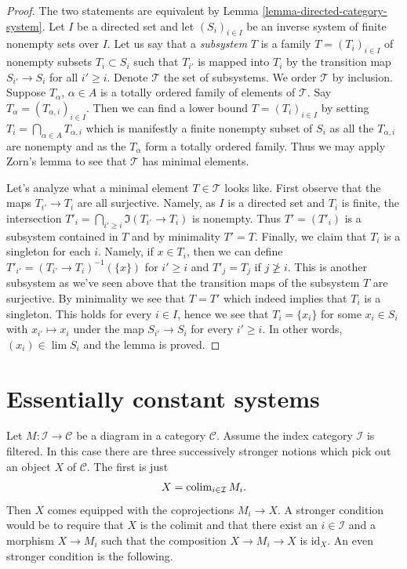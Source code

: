 \begin{proof}
The two statements are equivalent by
Lemma \ref{lemma-directed-category-system}.
Let $I$ be a directed set and let $(S_i)_{i \in I}$
be an inverse system of finite nonempty sets over $I$.
Let us say that a {\it subsystem} $T$ is a family $T = (T_i)_{i \in I}$
of nonempty subsets $T_i \subset S_i$ such that $T_{i'}$ is mapped
into $T_i$ by the transition map $S_{i'} \to S_i$ for all $i' \geq i$.
Denote $\mathcal{T}$ the set of subsystems. We order $\mathcal{T}$
by inclusion. Suppose $T_\alpha$, $\alpha \in A$ is a totally ordered family
of elements of $\mathcal{T}$. Say $T_\alpha = (T_{\alpha, i})_{i \in I}$.
Then we can find a lower bound $T = (T_i)_{i \in I}$ by setting
$T_i = \bigcap_{\alpha \in A} T_{\alpha, i}$ which is manifestly a
finite nonempty subset of $S_i$ as all the $T_{\alpha, i}$ are nonempty
and as the $T_\alpha$ form a totally ordered family. Thus we may
apply Zorn's lemma to see that $\mathcal{T}$ has minimal elements.

\medskip\noindent
Let's analyze what a minimal element $T \in \mathcal{T}$ looks like.
First observe that the maps $T_{i'} \to T_i$ are all surjective.
Namely, as $I$ is a directed set and $T_i$ is finite,
the intersection $T'_i = \bigcap_{i' \geq i} \Im(T_{i'} \to T_i)$
is nonempty. Thus $T' = (T'_i)$ is a subsystem contained in $T$ and
by minimality $T' = T$. Finally, we claim that $T_i$ is a singleton
for each $i$. Namely, if $x \in T_i$, then we can define
$T'_{i'} = (T_{i'} \to T_i)^{-1}(\{x\})$ for $i' \geq i$ and
$T'_j = T_j$ if $j \not \geq i$. This is another subsystem as we've seen
above that the transition maps of the subsystem $T$ are surjective.
By minimality we see that $T = T'$ which indeed implies that $T_i$
is a singleton. This holds for every $i \in I$, hence we see that
$T_i = \{x_i\}$ for some $x_i \in S_i$ with $x_{i'} \mapsto x_i$
under the map $S_{i'} \to S_i$ for every $i' \geq i$. In other words,
$(x_i) \in \lim S_i$ and the lemma is proved.
\end{proof}






\section{Essentially constant systems}
\label{section-essentially-constant}

\noindent
Let $M : \mathcal{I} \to \mathcal{C}$ be a diagram in a category $\mathcal{C}$.
Assume the index category $\mathcal{I}$ is filtered. In this case
there are three successively stronger notions which pick out an object
$X$ of $\mathcal{C}$. The first is just
$$
X = \mathop{\mathrm{colim}}\nolimits_{i \in \mathcal{I}} M_i.
$$
Then $X$ comes equipped with the coprojections $M_i \to X$.
A stronger condition would be to require that $X$ is the colimit and
that there exist an $i \in \mathcal{I}$ and a morphism $X \to M_i$ such
that the composition $X \to M_i \to X$ is $\text{id}_X$. An even
stronger condition is the following.

